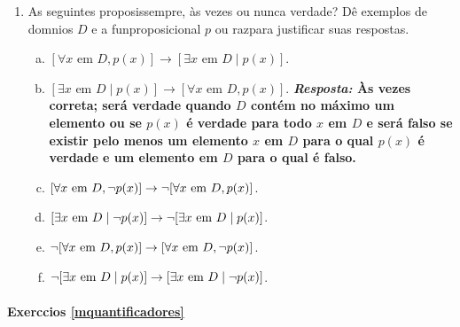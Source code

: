 \begin{enumerate}[{\bf 1.}]
\item As seguintes proposi\coes s\ao sempre, \`as vezes ou nunca verdade? D\^e exemplos de dom\ih nios $D$ e a fun\cao proposicional $p$ ou raz\oes para justificar suas respostas. 
\begin{enumerate}[a)]
\item $[\forall x \textrm{ em } D, p(x)]\to[\exists x \textrm{ em } D \mid  p(x)]$.
\item $[\exists x \textrm{ em } D \mid  p(x)]\to[\forall x \textrm{ em } D, p(x)]$. {\bf{\it Resposta:} \`As vezes correta; ser\'a verdade quando $D$ cont\'em no m\'aximo um elemento ou se $p(x)$ \'e verdade para todo $x$ em $D$ e ser\'a falso se existir pelo menos um elemento $x$ em $D$ para o qual $p(x)$ \'e verdade e um elemento em $D$ para o qual \'e falso. }
\item $[\forall x \textrm{ em } D, \lnot p(x)]\to\lnot[\forall x \textrm{ em } D, p(x)]$.
\item $[\exists x \textrm{ em } D \mid  \lnot p(x)]\to \lnot[\exists x \textrm{ em } D \mid  p(x)]$.
\item $\lnot[\forall x \textrm{ em } D, p(x)]\to[\forall x \textrm{ em } D, \lnot p(x)]$.
\item $\lnot[\exists x \textrm{ em } D \mid  p(x)]\to[\exists x \textrm{ em } D \mid  \lnot p(x)]$.
\end{enumerate}
\end{enumerate}
\paragraph{Exerc\ih cios \ref{mquantificadores}}

